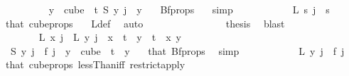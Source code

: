 \begin{isabellebody}
\ \ \ \ \ \ \ \ \isamarkupfalse%
\ {\isachardoublequoteopen}{\isasymforall}y\ {\isasymin}\ cube\ {}\ t{\isachardot}{\kern0pt}\ {\isacharparenleft}{\kern0pt}S\ y{\isacharparenright}{\kern0pt}\ j\ {\isacharequal}{\kern0pt}\ y\ {}{\isachardoublequoteclose}\ \isamarkupfalse%
\ Bf{\isacharunderscore}{\kern0pt}props\ {}\ \isamarkupfalse%
\ simp\isanewline
\ \ \ \ \ \ \ \ \isamarkupfalse%
\ \isamarkupfalse%
\ {\isachardoublequoteopen}L\ s\ j\ {\isacharequal}{\kern0pt}\ s{\isachardoublequoteclose}\ \isamarkupfalse%
\ that\ cube{\isacharunderscore}{\kern0pt}props{\isacharparenleft}{\kern0pt}{}{\isacharcomma}{\kern0pt}{}{\isacharparenright}{\kern0pt}\ \ \isamarkupfalse%
\ L{\isacharunderscore}{\kern0pt}def\ \isamarkupfalse%
\ auto\isanewline
\ \ \ \ \ \ \isamarkupfalse%
\isanewline
\ \ \ \ \ \ \isamarkupfalse%
\ \isamarkupfalse%
\ {\isacharquery}{\kern0pt}thesis\ \isamarkupfalse%
\ blast\isanewline
\ \ \ \ \isamarkupfalse%
\isanewline
\ \ \ \ \ \ \isamarkupfalse%
\ {}\isanewline
\ \ \ \ \ \ \isamarkupfalse%
\ {\isachardoublequoteopen}L\ x\ j\ {\isacharequal}{\kern0pt}\ L\ y\ j{\isachardoublequoteclose}\ \ {\isachardoublequoteopen}x\ {\isacharless}{\kern0pt}\ t{\isachardoublequoteclose}\ \ {\isachardoublequoteopen}y\ {\isacharless}{\kern0pt}\ t{\isachardoublequoteclose}\ \ x\ y\isanewline
\ \ \ \ \ \ \isamarkupfalse%
{\isacharminus}{\kern0pt}\isanewline
\ \ \ \ \ \ \ \ \isamarkupfalse%
\ {\isacharasterisk}{\kern0pt}{\isacharcolon}{\kern0pt}\ {\isachardoublequoteopen}S\ y\ j\ {\isacharequal}{\kern0pt}\ f\ j{\isachardoublequoteclose}\ \ {\isachardoublequoteopen}y\ {\isasymin}\ cube\ {}\ t{\isachardoublequoteclose}\ \ y\ \isamarkupfalse%
\ {}\ that\ Bf{\isacharunderscore}{\kern0pt}props\ \isamarkupfalse%
\ simp\isanewline
\ \ \ \ \ \ \ \ \isamarkupfalse%
\ \isamarkupfalse%
\ {\isachardoublequoteopen}L\ y\ j\ {\isacharequal}{\kern0pt}\ f\ j{\isachardoublequoteclose}\ \isamarkupfalse%
\ that{\isacharparenleft}{\kern0pt}{}{\isacharparenright}{\kern0pt}\ cube{\isacharunderscore}{\kern0pt}props{\isacharparenleft}{\kern0pt}{}{\isacharcomma}{\kern0pt}{}{\isacharparenright}{\kern0pt}\ lessThan{\isacharunderscore}{\kern0pt}iff\ restrict{\isacharunderscore}{\kern0pt}apply\ \isamarkupfalse%

\end{isabellebody}
